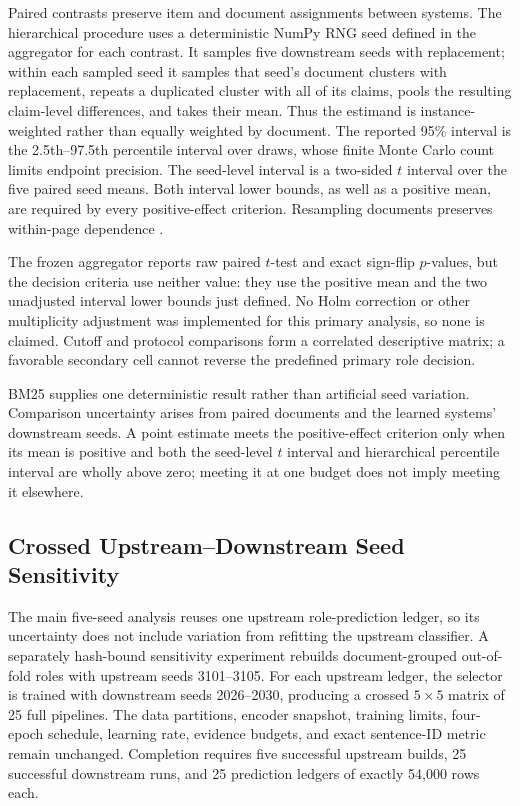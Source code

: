 \documentclass[applsci,article,submit,moreauthors]{Definitions/mdpi}
\begin{document}
Paired contrasts preserve item and document assignments between systems. The hierarchical procedure uses a deterministic NumPy RNG seed defined in the aggregator for each contrast. It samples five downstream seeds with replacement; within each sampled seed it samples that seed's document clusters with replacement, repeats a duplicated cluster with all of its claims, pools the resulting claim-level differences, and takes their mean. Thus the estimand is instance-weighted rather than equally weighted by document. The reported 95\% interval is the 2.5th--97.5th percentile interval over \BootstrapSamples{} draws, whose finite Monte Carlo count limits endpoint precision. The seed-level interval is a two-sided $t$ interval over the five paired seed means. Both interval lower bounds, as well as a positive mean, are required by every positive-effect criterion. Resampling documents preserves within-page dependence \cite{cameron2008bootstrap}.

The frozen aggregator reports raw paired $t$-test and exact sign-flip $p$-values, but the decision criteria use neither value: they use the positive mean and the two unadjusted interval lower bounds just defined. No Holm correction or other multiplicity adjustment was implemented for this primary analysis, so none is claimed. Cutoff and protocol comparisons form a correlated descriptive matrix; a favorable secondary cell cannot reverse the predefined primary role decision.

BM25 supplies one deterministic result rather than artificial seed variation. Comparison uncertainty arises from paired documents and the learned systems' downstream seeds. A point estimate meets the positive-effect criterion only when its mean is positive and both the seed-level $t$ interval and hierarchical percentile interval are wholly above zero; meeting it at one budget does not imply meeting it elsewhere.

\subsection{Crossed Upstream--Downstream Seed Sensitivity}
The main five-seed analysis reuses one upstream role-prediction ledger, so its uncertainty does not include variation from refitting the upstream classifier. A separately hash-bound sensitivity experiment rebuilds document-grouped out-of-fold roles with upstream seeds 3101--3105. For each upstream ledger, the selector is trained with downstream seeds 2026--2030, producing a crossed $5\times5$ matrix of 25 full pipelines. The data partitions, encoder snapshot, training limits, four-epoch schedule, learning rate, evidence budgets, and exact sentence-ID metric remain unchanged. Completion requires five successful upstream builds, 25 successful downstream runs, and 25 prediction ledgers of exactly 54,000 rows each.
\end{document}
